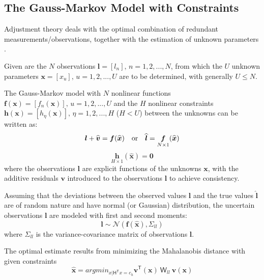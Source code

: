 \clearpage
\subsection{The Gauss-Markov Model with Constraints}
\label{subsec:LSmodel}

Adjustment theory deals with the optimal combination of redundant measurements/observations, together with the estimation of unknown parameters \cite{Teunissen2000}.

Given are the $N$ observations $\boldsymbol l=[l_n],\,n=1,2,...,N$, from which the $U$ unknown parameters $\boldsymbol x=[x_u],\,u=1,2,...,U$ are to be determined, with generally $U\leq N$.%

The Gauss-Markov model with $N$ nonlinear functions $\boldsymbol f(\boldsymbol x)=[f_n(\boldsymbol x)],\,u=1,2,...,U$ and the $H$ nonlinear constraints $\boldsymbol h(\boldsymbol x)=[h_\eta(\boldsymbol x)],\,\eta=1,2,...,H$ %
($H<U$) between the unknowns can be written as:
\begin{equation} \label{eq:GM-ObsEq}
\boldsymbol l+\widehat{\boldsymbol v}=\boldsymbol f(\widehat{\boldsymbol x})\quad \textnormal{or}\quad \widehat{\boldsymbol l}=\underset{N\times 1}{\boldsymbol f}(\widehat{\boldsymbol x})
\end{equation}
\begin{equation} \label{eq:GM-ConEq}
\underset{H\times 1}{\boldsymbol h}(\widehat{\boldsymbol x})=\mathbf{0}
\end{equation}
where the observations $\boldsymbol l$ are explicit functions of the unknowns $\boldsymbol x$, with the additive residuals $\boldsymbol v$ introduced to the observations $\boldsymbol l$ to achieve consistency.

Assuming that the deviations between the observed values $\boldsymbol l$ and the true values $\widehat{\boldsymbol l}$ are of random nature and have normal (or Gaussian) distribution, the uncertain observations $\boldsymbol l$ are modeled with first and second moments:
\begin{equation}
\boldsymbol l\sim\mathcal{N}(\boldsymbol f(\widehat{\boldsymbol x}) ,\mathsf{\Sigma}_{ll})
\end{equation}
where $\mathsf{\Sigma}_{ll}$ is the variance-covariance matrix of observations $\boldsymbol l$.%



The optimal estimate results from minimizing the Mahalanobis distance with given constraints
\begin{equation}
\widehat{\boldsymbol x}=
argmin_{x|\mathsf{H^T}x=c_h}
\boldsymbol v^\mathsf{T}(\boldsymbol x)\:
\mathsf{W}_{ll}\:
\boldsymbol v(\boldsymbol x)
\end{equation}

